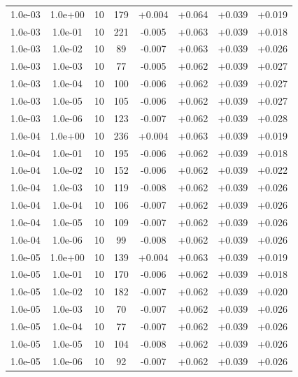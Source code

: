 \documentclass[11pt,a4paper]{article}
\begin{document}
\begin{table}
{\begin{tabular}{*{8}c}
 1.0e-03 	 & 1.0e+00 	 & 10 & 179 	 & +0.004 & +0.064 & +0.039 & +0.019 \\ 
 1.0e-03 	 & 1.0e-01 	 & 10 & 221 	 & -0.005 & +0.063 & +0.039 & +0.018 \\ 
 1.0e-03 	 & 1.0e-02 	 & 10 & 89 	 & -0.007 & +0.063 & +0.039 & +0.026 \\ 
 1.0e-03 	 & 1.0e-03 	 & 10 & 77 	 & -0.005 & +0.062 & +0.039 & +0.027 \\ 
 1.0e-03 	 & 1.0e-04 	 & 10 & 100 	 & -0.006 & +0.062 & +0.039 & +0.027 \\ 
 1.0e-03 	 & 1.0e-05 	 & 10 & 105 	 & -0.006 & +0.062 & +0.039 & +0.027 \\ 
 1.0e-03 	 & 1.0e-06 	 & 10 & 123 	 & -0.007 & +0.062 & +0.039 & +0.028 \\ 


 1.0e-04 	 & 1.0e+00 	 & 10 & 236 	 & +0.004 & +0.063 & +0.039 & +0.019 \\ 
 1.0e-04 	 & 1.0e-01 	 & 10 & 195 	 & -0.006 & +0.062 & +0.039 & +0.018 \\ 
 1.0e-04 	 & 1.0e-02 	 & 10 & 152 	 & -0.006 & +0.062 & +0.039 & +0.022 \\ 
 1.0e-04 	 & 1.0e-03 	 & 10 & 119 	 & -0.008 & +0.062 & +0.039 & +0.026 \\ 
 1.0e-04 	 & 1.0e-04 	 & 10 & 106 	 & -0.007 & +0.062 & +0.039 & +0.026 \\ 
 1.0e-04 	 & 1.0e-05 	 & 10 & 109 	 & -0.007 & +0.062 & +0.039 & +0.026 \\ 
 1.0e-04 	 & 1.0e-06 	 & 10 & 99 	 & -0.008 & +0.062 & +0.039 & +0.026 \\
 
 1.0e-05 	 & 1.0e+00 	 & 10 & 139 	 & +0.004 & +0.063 & +0.039 & +0.019 \\ 
 1.0e-05 	 & 1.0e-01 	 & 10 & 170 	 & -0.006 & +0.062 & +0.039 & +0.018 \\ 
 1.0e-05 	 & 1.0e-02 	 & 10 & 182 	 & -0.007 & +0.062 & +0.039 & +0.020 \\ 
 1.0e-05 	 & 1.0e-03 	 & 10 & 70 	 & -0.007 & +0.062 & +0.039 & +0.026 \\ 
 1.0e-05 	 & 1.0e-04 	 & 10 & 77 	 & -0.007 & +0.062 & +0.039 & +0.026 \\ 
 1.0e-05 	 & 1.0e-05 	 & 10 & 104 	 & -0.008 & +0.062 & +0.039 & +0.026 \\ 
 1.0e-05 	 & 1.0e-06 	 & 10 & 92 	 & -0.007 & +0.062 & +0.039 & +0.026 \\ 


\end{tabular}}
\end{table}
\end{document}
